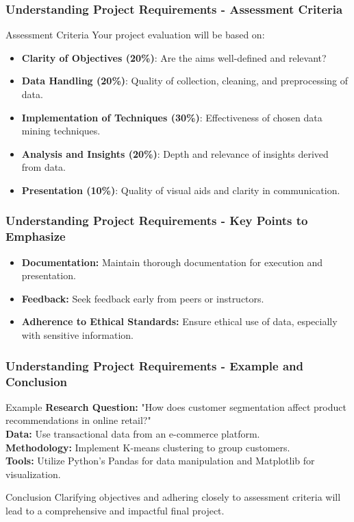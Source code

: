 \documentclass[aspectratio=169]{beamer}
\begin{document}
\begin{frame}[fragile]
    \frametitle{Understanding Project Requirements - Assessment Criteria}
    \begin{block}{Assessment Criteria}
        Your project evaluation will be based on:
        \begin{itemize}
            \item \textbf{Clarity of Objectives (20\%)}: Are the aims well-defined and relevant?
            \item \textbf{Data Handling (20\%)}: Quality of collection, cleaning, and preprocessing of data.
            \item \textbf{Implementation of Techniques (30\%)}: Effectiveness of chosen data mining techniques.
            \item \textbf{Analysis and Insights (20\%)}: Depth and relevance of insights derived from data.
            \item \textbf{Presentation (10\%)}: Quality of visual aids and clarity in communication.
        \end{itemize}
    \end{block}
\end{frame}

\begin{frame}[fragile]
    \frametitle{Understanding Project Requirements - Key Points to Emphasize}
    \begin{itemize}
        \item \textbf{Documentation:} Maintain thorough documentation for execution and presentation.
        \item \textbf{Feedback:} Seek feedback early from peers or instructors.
        \item \textbf{Adherence to Ethical Standards:} Ensure ethical use of data, especially with sensitive information.
    \end{itemize}
\end{frame}

\begin{frame}[fragile]
    \frametitle{Understanding Project Requirements - Example and Conclusion}
    \begin{block}{Example}
        \textbf{Research Question:} "How does customer segmentation affect product recommendations in online retail?"\\
        \textbf{Data:} Use transactional data from an e-commerce platform.\\
        \textbf{Methodology:} Implement K-means clustering to group customers.\\
        \textbf{Tools:} Utilize Python's Pandas for data manipulation and Matplotlib for visualization.
    \end{block}

    \begin{block}{Conclusion}
        Clarifying objectives and adhering closely to assessment criteria will lead to a comprehensive and impactful final project.
    \end{block}
\end{frame}
\end{document}
